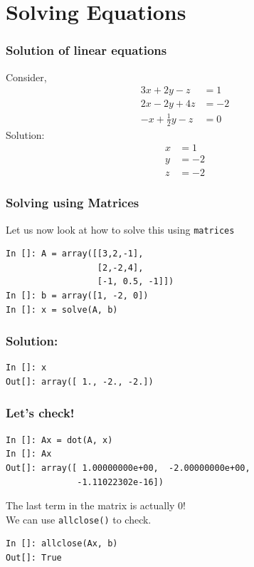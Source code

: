\section{Solving Equations}

\begin{frame}[fragile]
\frametitle{Solution of linear equations}
Consider,
  \begin{align*}
    3x + 2y - z  & = 1 \\
    2x - 2y + 4z  & = -2 \\
    -x + \frac{1}{2}y -z & = 0
  \end{align*}
Solution:
  \begin{align*}
    x & = 1 \\
    y & = -2 \\
    z & = -2
  \end{align*}
\end{frame}

\begin{frame}[fragile]
\frametitle{Solving using Matrices}
Let us now look at how to solve this using \texttt{matrices}
  \begin{lstlisting}
In []: A = array([[3,2,-1],
                  [2,-2,4],                   
                  [-1, 0.5, -1]])
In []: b = array([1, -2, 0])
In []: x = solve(A, b)
  \end{lstlisting}
\end{frame}

\begin{frame}[fragile]
\frametitle{Solution:}
\begin{lstlisting}
In []: x
Out[]: array([ 1., -2., -2.])
\end{lstlisting}
\end{frame}

\begin{frame}[fragile]
\frametitle{Let's check!}
\begin{small}
\begin{lstlisting}
In []: Ax = dot(A, x)
In []: Ax
Out[]: array([ 1.00000000e+00,  -2.00000000e+00, 
              -1.11022302e-16])
\end{lstlisting}
\end{small}
\begin{block}{}
The last term in the matrix is actually \alert{0}!\\
We can use \texttt{allclose()} to check.
\end{block}
\begin{lstlisting}
In []: allclose(Ax, b)
Out[]: True
\end{lstlisting}
\end{frame}

